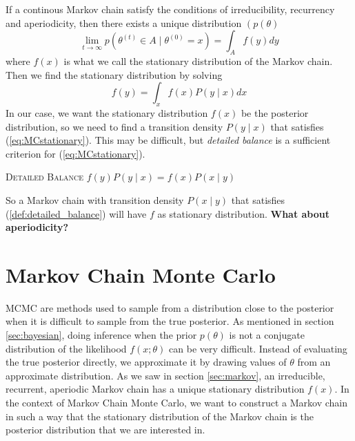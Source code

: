 If a continous Markov chain satisfy the conditions of irreducibility, recurrency and aperiodicity, then there exists a unique distribution $\left(p\left(\theta\right)$   
\begin{equation*}
\lim_{t\xrightarrow{}\infty}p\left(\theta^{(t)}\in A\mid \theta^{(0)} = x\right) = \int_{A} f\left(y\right) dy
\end{equation*}
where $f\left(x\right)$ is what we call the stationary distribution of the Markov chain. Then we find the stationary distribution by solving 
\begin{equation}\label{eq:MCstationary}
    f(y) = \int_x f(x) P(y\mid x) dx 
\end{equation}In our case, we want the stationary distribution $f(x)$ be the posterior distribution, so we need to find a transition density  $P\left(y\mid x\right)$ that satisfies (\ref{eq:MCstationary}). This may be difficult, but \textit{detailed balance} is a sufficient criterion for (\ref{eq:MCstationary}). 
\theoremstyle{definition}
\begin{definition}{\textsc{Detailed Balance}} \label{def:detailed_balance}
   $ f(y)P\left(y\mid x\right) = f(x)P\left(x\mid y\right)$
\end{definition}
So a Markov chain with transition density $P\left(x\mid y\right)$ that satisfies (\ref{def:detailed_balance}) will have $f$ as stationary distribution. 
\textbf{What about aperiodicity?}
\section{Markov Chain Monte Carlo}
MCMC are  methods used to sample from a distribution close to the posterior when it is difficult to sample from the true posterior. As mentioned in section \ref{sec:bayesian}, 
doing inference when the prior $p\left(\theta\right)$ is not a conjugate distribution of the likelihood $f\left(x ; \theta\right)$ can be very difficult.
Instead of evaluating the true posterior directly, we approximate it by drawing values of $\theta$ from an approximate distribution. 
As we saw in  section \ref{sec:markov}, an irreducible, recurrent, aperiodic Markov chain has a unique stationary distribution $f(x)$.
In the context of Markov Chain Monte Carlo, we want to construct a Markov chain in such a way that the stationary distribution of the Markov chain is the posterior distribution that we are interested in. 
